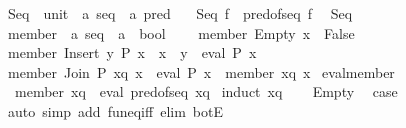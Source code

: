 \begin{isabellebody}
\isanewline
{}\isamarkupfalse%
\ Seq\ {\isacharcolon}{\kern0pt}{\isacharcolon}{\kern0pt}\ {\isachardoublequoteopen}{\isacharparenleft}{\kern0pt}unit\ {\isasymRightarrow}\ {\isacharprime}{\kern0pt}a\ seq{\isacharparenright}{\kern0pt}\ {\isasymRightarrow}\ {\isacharprime}{\kern0pt}a\ pred{\isachardoublequoteclose}\ \isanewline
\ \ {\isachardoublequoteopen}Seq\ f\ {\isacharequal}{\kern0pt}\ pred{\isacharunderscore}{\kern0pt}of{\isacharunderscore}{\kern0pt}seq\ {\isacharparenleft}{\kern0pt}f\ {\isacharparenleft}{\kern0pt}{\isacharparenright}{\kern0pt}{\isacharparenright}{\kern0pt}{\isachardoublequoteclose}\isanewline
\isanewline
{}\isamarkupfalse%
\ Seq\isanewline
\isanewline
{}\isamarkupfalse%
\ member\ {\isacharcolon}{\kern0pt}{\isacharcolon}{\kern0pt}\ {\isachardoublequoteopen}{\isacharprime}{\kern0pt}a\ seq\ {\isasymRightarrow}\ {\isacharprime}{\kern0pt}a\ {\isasymRightarrow}\ bool{\isachardoublequoteclose}\ \ \isanewline
\ \ {\isachardoublequoteopen}member\ Empty\ x\ {\isasymlongleftrightarrow}\ False{\isachardoublequoteclose}\isanewline
{\isacharbar}{\kern0pt}\ {\isachardoublequoteopen}member\ {\isacharparenleft}{\kern0pt}Insert\ y\ P{\isacharparenright}{\kern0pt}\ x\ {\isasymlongleftrightarrow}\ x\ {\isacharequal}{\kern0pt}\ y\ {\isasymor}\ eval\ P\ x{\isachardoublequoteclose}\isanewline
{\isacharbar}{\kern0pt}\ {\isachardoublequoteopen}member\ {\isacharparenleft}{\kern0pt}Join\ P\ xq{\isacharparenright}{\kern0pt}\ x\ {\isasymlongleftrightarrow}\ eval\ P\ x\ {\isasymor}\ member\ xq\ x{\isachardoublequoteclose}\isanewline
\isanewline
{}\isamarkupfalse%
\ eval{\isacharunderscore}{\kern0pt}member{\isacharcolon}{\kern0pt}\isanewline
\ \ {\isachardoublequoteopen}member\ xq\ {\isacharequal}{\kern0pt}\ eval\ {\isacharparenleft}{\kern0pt}pred{\isacharunderscore}{\kern0pt}of{\isacharunderscore}{\kern0pt}seq\ xq{\isacharparenright}{\kern0pt}{\isachardoublequoteclose}\isanewline
%
\isadelimproof
%
\endisadelimproof
%
\isatagproof
{}\isamarkupfalse%
\ {\isacharparenleft}{\kern0pt}induct\ xq{\isacharparenright}{\kern0pt}\isanewline
\ \ \isamarkupfalse%
\ Empty\ \isamarkupfalse%
\ {\isacharquery}{\kern0pt}case\isanewline
\ \ \isamarkupfalse%
\ {\isacharparenleft}{\kern0pt}auto\ simp\ add{\isacharcolon}{\kern0pt}\ fun{\isacharunderscore}{\kern0pt}eq{\isacharunderscore}{\kern0pt}iff\ elim{\isacharcolon}{\kern0pt}\ botE{\isacharparenright}{\kern0pt}\isanewline
{}\isamarkupfalse%

\end{isabellebody}
